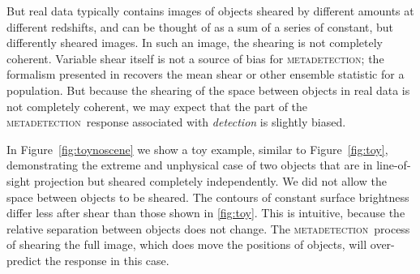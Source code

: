 \documentclass[iop, twocolappendix, appendixfloats, numberedappendix, apj]{hackemulateapj}
\newcommand{\mdet}{\textsc{metadetection}}
\begin{document}
But real data typically contains images of objects sheared by different amounts
at different redshifts, and can be thought of as a sum of a series of constant,
but differently sheared images.  In such an image, the shearing is not
completely coherent.  Variable shear itself is not a source of bias for \mdet;
the formalism presented in \citep{SheldonMcal2017} recovers the mean shear or
other ensemble statistic for a population.  But because the shearing of the
space between objects in real data is not completely coherent, we may expect
that the part of the \mdet\ response associated with {\em detection} is
slightly biased.

In Figure~\ref{fig:toynoscene} we show a toy example, similar to
Figure~\ref{fig:toy}, demonstrating the extreme and unphysical case of two
objects that are in line-of-sight projection but sheared completely
independently.  We did not allow the space between objects to be sheared. The
contours of constant surface brightness differ less after shear than those
shown in \ref{fig:toy}.  This is intuitive, because the relative separation
between objects does not change.  The \mdet\ process of shearing the full
image, which does move the positions of objects, will over-predict the response
in this case.
\end{document}
